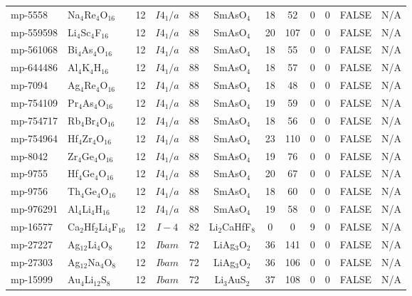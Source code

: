 {\begin{longtable}{llcccccccccc}
    mp-5558 & Na$_{4}$Re$_{4}$O$_{16}$ & 12    & $I4_1/a$ & 88    & SmAsO$_{4}$ & 18    & 52    & 0     & 0     & FALSE & N/A \\
    mp-559598 & Li$_{4}$Sc$_{4}$F$_{16}$ & 12    & $I4_1/a$ & 88    & SmAsO$_{4}$ & 20    & 107   & 0     & 0     & FALSE & N/A \\
    mp-561068 & Bi$_{4}$As$_{4}$O$_{16}$ & 12    & $I4_1/a$ & 88    & SmAsO$_{4}$ & 18    & 55    & 0     & 0     & FALSE & N/A \\
    mp-644486 & Al$_{4}$K$_{4}$H$_{16}$ & 12    & $I4_1/a$ & 88    & SmAsO$_{4}$ & 18    & 57    & 0     & 0     & FALSE & N/A \\
    mp-7094 & Ag$_{4}$Re$_{4}$O$_{16}$ & 12    & $I4_1/a$ & 88    & SmAsO$_{4}$ & 18    & 48    & 0     & 0     & FALSE & N/A \\
    mp-754109 & Pr$_{4}$As$_{4}$O$_{16}$ & 12    & $I4_1/a$ & 88    & SmAsO$_{4}$ & 19    & 59    & 0     & 0     & FALSE & N/A \\
    mp-754717 & Rb$_{4}$Br$_{4}$O$_{16}$ & 12    & $I4_1/a$ & 88    & SmAsO$_{4}$ & 18    & 56    & 0     & 0     & FALSE & N/A \\
    mp-754964 & Hf$_{4}$Zr$_{4}$O$_{16}$ & 12    & $I4_1/a$ & 88    & SmAsO$_{4}$ & 23    & 110   & 0     & 0     & FALSE & N/A \\
    mp-8042 & Zr$_{4}$Ge$_{4}$O$_{16}$ & 12    & $I4_1/a$ & 88    & SmAsO$_{4}$ & 19    & 76    & 0     & 0     & FALSE & N/A \\
    mp-9755 & Hf$_{4}$Ge$_{4}$O$_{16}$ & 12    & $I4_1/a$ & 88    & SmAsO$_{4}$ & 20    & 67    & 0     & 0     & FALSE & N/A \\
    mp-9756 & Th$_{4}$Ge$_{4}$O$_{16}$ & 12    & $I4_1/a$ & 88    & SmAsO$_{4}$ & 18    & 60    & 0     & 0     & FALSE & N/A \\
    mp-976291 & Al$_{4}$Li$_{4}$H$_{16}$ & 12    & $I4_1/a$ & 88    & SmAsO$_{4}$ & 19    & 58    & 0     & 0     & FALSE & N/A \\
    mp-16577 & Ca$_{2}$Hf$_{2}$Li$_{4}$F$_{16}$ & 12    & $I-4$ & 82    & Li$_{2}$CaHfF$_{8}$ & 0     & 0     & 9     & 0     & FALSE & N/A \\
    mp-27227 & Ag$_{12}$Li$_{4}$O$_{8}$ & 12    & $Ibam$ & 72    & LiAg$_{3}$O$_{2}$ & 36    & 141   & 0     & 0     & FALSE & N/A \\
    mp-27303 & Ag$_{12}$Na$_{4}$O$_{8}$ & 12    & $Ibam$ & 72    & LiAg$_{3}$O$_{2}$ & 36    & 106   & 0     & 0     & FALSE & N/A \\
    mp-15999 & Au$_{4}$Li$_{12}$S$_{8}$ & 12    & $Ibam$ & 72    & Li$_{3}$AuS$_{2}$ & 37    & 108   & 0     & 0     & FALSE & N/A \\

\end{longtable}}
